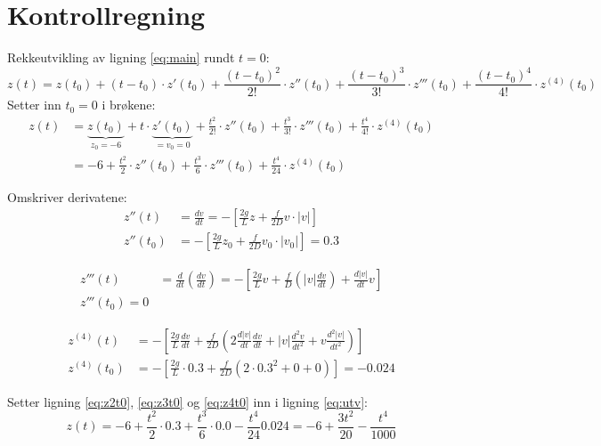 \section{Kontrollregning} %
\label{sec:kontrollregning}
Rekkeutvikling av ligning \eqref{eq:main} rundt $t=0$:
\begin{equation}
  z(t)  = z(t_0) + (t-t_0) \cdot z'(t_0)
        + \frac{(t-t_0)^2}{2!} \cdot z''(t_0)
        + \frac{(t-t_0)^3}{3!} \cdot z'''(t_0)
        + \frac{(t-t_0)^4}{4!} \cdot z^{(4)}(t_0)
\end{equation}
Setter inn $t_0 = 0$ i brøkene:
\begin{align}
  z(t) &= \underbrace{z(t_0)}_{z_0=-6}
        + t \cdot \underbrace{z'(t_0)}_{=v_0=0}
        + \frac{t^2}{2!} \cdot z''(t_0)
        + \frac{t^3}{3!} \cdot z'''(t_0)
        + \frac{t^4}{4!} \cdot z^{(4)}(t_0) \nonumber\\
       &= -6 + \frac{t^2}{2} \cdot z''(t_0)
        + \frac{t^3}{6} \cdot z'''(t_0)
        + \frac{t^4}{24} \cdot z^{(4)}(t_0) \label{eq:utv}
\end{align}

\noindent Omskriver derivatene:
\begin{align}
  z''(t)   & = \frac{dv}{dt}=-\left[\frac{2g}{L}z+\frac{f}{2D}v\cdot |v|\right]\\
  z''(t_0) & = -\left[\frac{2g}{L}z_0 + \frac{f}{2D}v_0 \cdot |v_0|\right]
             = 0.3 \label{eq:z2t0}
\end{align}

\begin{align}
  z'''(t) & =  \frac{d}{dt} \left( \frac{dv}{dt} \right)
          = -\left[\frac{2g}{L}v+\frac{f}{D}
            \left( |v| \frac{dv}{dt} \right) + \frac{d|v|}{dt} v \right] \\
  z'''(t_0) = 0 \label{eq:z3t0}
\end{align}

\begin{align}
  z^{(4)}(t) &=
  - \left[
    \frac{2g}{L}\frac{dv}{dt} +
    \frac{f}{2D}
      \left(
        2 \frac{d|v|}{dt} \frac{dv}{dt} +
        |v| \frac{d^2v}{dt^2} +
        v \frac{d^2|v|}{dt^2}
      \right)
  \right] \\
  z^{(4)}(t_0) &=
    - \left[
    \frac{2g}{L} \cdot 0.3+
    \frac{f}{2D}
      \left(
        2 \cdot 0.3^2 +
        0 +
        0
      \right)
  \right] = -0.024 \label{eq:z4t0}
\end{align}

Setter ligning \eqref{eq:z2t0}, \eqref{eq:z3t0} og \eqref{eq:z4t0} inn i ligning \eqref{eq:utv}:
\begin{equation}
  z(t)  = -6 + \frac{t^2}{2} \cdot 0.3
        + \frac{t^3}{6} \cdot 0.0
        - \frac{t^4}{24} 0.024 \nonumber
        = -6 + \frac{3t^2}{20}
        - \frac{t^4}{1000}
\end{equation}

